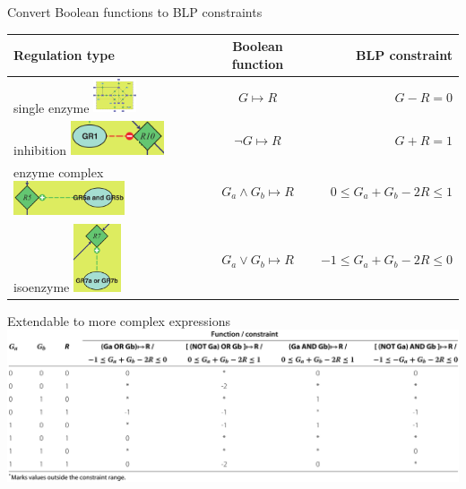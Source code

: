 \documentclass{beamer}
\begin{document}
\begin{frame}{Convert Boolean functions to BLP constraints}
\begin{tabular}{|P{4cm} | c |r |}
\hline
Regulation type  &  Boolean function     &  BLP constraint \\
\hline
\hline
single enzyme 
\includegraphics[height=1cm]{grafik/catalyse}
  & $G  	\mapsto R$    & $G -R = 0$ \\ 
\hline
 inhibition
\includegraphics[height=1cm]{grafik/inhibition}    
 & $\neg G \mapsto R$ & $G + R = 1 $ \\
\hline
enzyme complex   
\includegraphics[height=1cm]{grafik/complex}
 & $G_{a} \land G_{b} \mapsto R $ &  $0 \leq G_{a} + G_{b} - 2R \leq 1 $\\
\hline
isoenzyme \newline 
\includegraphics[height=2cm]{grafik/isoenzyme}
 &   $G_{a} \lor G_{b} \mapsto R$  &   $-1 \leq G_{a} + G_{b} - 2R \leq 0 $ \\
\hline
\end{tabular}

\end{frame}

\begin{frame}{Extendable to more complex expressions}
    \centering
    \includegraphics[width=1\textwidth]{grafik/table3}
\end{frame}
\end{document}
